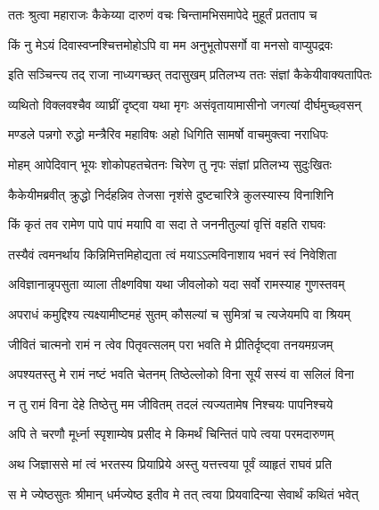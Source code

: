 
\twolineshloka
{ततः श्रुत्वा महाराजः कैकेय्या दारुणं वचः}
{चिन्तामभिसमापेदे मुहूर्तं प्रतताप च} %

\twolineshloka
{किं नु मेऽयं दिवास्वप्नश्चित्तमोहोऽपि वा मम}
{अनुभूतोपसर्गो वा मनसो वाप्युपद्रवः} %

\twolineshloka
{इति सञ्चिन्त्य तद् राजा नाध्यगच्छत् तदासुखम्}
{प्रतिलभ्य ततः संज्ञां कैकेयीवाक्यतापितः} %

\twolineshloka
{व्यथितो विक्लवश्चैव व्याघ्रीं दृष्ट्वा यथा मृगः}
{असंवृतायामासीनो जगत्यां दीर्घमुच्छ्वसन्} %

\twolineshloka
{मण्डले पन्नगो रुद्धो मन्त्रैरिव महाविषः}
{अहो धिगिति सामर्षो वाचमुक्त्वा नराधिपः} %

\twolineshloka
{मोहम् आपेदिवान् भूयः शोकोपहतचेतनः}
{चिरेण तु नृपः संज्ञां प्रतिलभ्य सुदुःखितः} %

\twolineshloka
{कैकेयीमब्रवीत् क्रुद्धो निर्दहन्निव तेजसा}
{नृशंसे दुष्टचारित्रे कुलस्यास्य विनाशिनि} %

\twolineshloka
{किं कृतं तव रामेण पापे पापं मयापि वा}
{सदा ते जननीतुल्यां वृत्तिं वहति राघवः} %

\twolineshloka
{तस्यैवं त्वमनर्थाय किन्निमित्तमिहोद्यता}
{त्वं मयाऽऽत्मविनाशाय भवनं स्वं निवेशिता} %

\twolineshloka
{अविज्ञानान्नृपसुता व्याला तीक्ष्णविषा यथा}
{जीवलोको यदा सर्वो रामस्याह गुणस्तवम्} %

\twolineshloka
{अपराधं कमुद्दिश्य त्यक्ष्यामीष्टमहं सुतम्}
{कौसल्यां च सुमित्रां च त्यजेयमपि वा श्रियम्} %

\twolineshloka
{जीवितं चात्मनो रामं न त्वेव पितृवत्सलम्}
{परा भवति मे प्रीतिर्दृष्ट्वा तनयमग्रजम्} %

\twolineshloka
{अपश्यतस्तु मे रामं नष्टं भवति चेतनम्}
{तिष्ठेल्लोको विना सूर्यं सस्यं वा सलिलं विना} %

\twolineshloka
{न तु रामं विना देहे तिष्ठेत्तु मम जीवितम्}
{तदलं त्यज्यतामेष निश्चयः पापनिश्चये} %

\twolineshloka
{अपि ते चरणौ मूर्ध्ना स्पृशाम्येष प्रसीद मे}
{किमर्थं चिन्तितं पापे त्वया परमदारुणम्} %

\twolineshloka
{अथ जिज्ञाससे मां त्वं भरतस्य प्रियाप्रिये}
{अस्तु यत्तत्त्वया पूर्वं व्याहृतं राघवं प्रति} %

\twolineshloka
{स मे ज्येष्ठसुतः श्रीमान् धर्मज्येष्ठ इतीव मे}
{तत् त्वया प्रियवादिन्या सेवार्थं कथितं भवेत्} %

